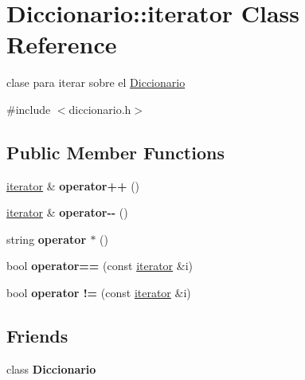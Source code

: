 \hypertarget{classDiccionario_1_1iterator}{}\section{Diccionario\+::iterator Class Reference}
\label{classDiccionario_1_1iterator}


clase para iterar sobre el \mbox{\hyperlink{classDiccionario}{Diccionario}}  




{\ttfamily \#include $<$diccionario.\+h$>$}

\subsection*{Public Member Functions}
\begin{DoxyCompactItemize}
\item 
\mbox{\label{classDiccionario_1_1iterator_ae3f020050c891ff3a94e599879401729}} 
\mbox{\hyperlink{classDiccionario_1_1iterator}{iterator}} \& {\bfseries operator++} ()
\item 
\mbox{\label{classDiccionario_1_1iterator_aaa91958b7e37a7ee804eca73164bd24e}} 
\mbox{\hyperlink{classDiccionario_1_1iterator}{iterator}} \& {\bfseries operator-\/-\/} ()
\item 
\mbox{\label{classDiccionario_1_1iterator_aa33a8036588c53778fcfaec5d974f90d}} 
string {\bfseries operator $\ast$} ()
\item 
\mbox{\label{classDiccionario_1_1iterator_a6ab38d0620a196200714ee04291dea55}} 
bool {\bfseries operator==} (const \mbox{\hyperlink{classDiccionario_1_1iterator}{iterator}} \&i)
\item 
\mbox{\label{classDiccionario_1_1iterator_a51b542aae209de6c7afff37c2c513d3a}} 
bool {\bfseries operator !=} (const \mbox{\hyperlink{classDiccionario_1_1iterator}{iterator}} \&i)
\end{DoxyCompactItemize}
\subsection*{Friends}
\begin{DoxyCompactItemize}
\item 
\mbox{\label{classDiccionario_1_1iterator_ad36be158dde0129b4e0d03d0e454a26b}} 
class {\bfseries Diccionario}
\end{DoxyCompactItemize}


